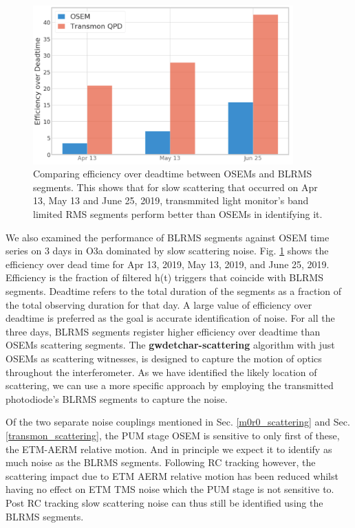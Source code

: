 \documentclass[12pt]{iopart}
\begin{document}
\par

\begin{figure}[h]
    \centering
    \includegraphics[width=10cm]{osemtransmon5.png}
    \caption{Comparing efficiency over deadtime between OSEMs and BLRMS segments. This shows that for slow scattering that occurred on Apr 13, May 13 and June 25, 2019, transmmited light monitor's band limited RMS segments perform better than OSEMs in identifying it.}
    \label{fig:osemtrans}
\end{figure}

We also examined the performance of BLRMS segments against OSEM time series on 3 days in O3a dominated by slow scattering noise. Fig. \ref{fig:osemtrans} shows the efficiency over dead time for Apr 13, 2019, May 13, 2019, and June 25, 2019. Efficiency is the fraction of filtered h(t) triggers that coincide with BLRMS segments. Deadtime refers to the total duration of the segments as a fraction of the total observing duration for that day. A large value of efficiency over deadtime is preferred as the goal is accurate identification of  noise. For all the three days, BLRMS segments register higher efficiency over deadtime than OSEMs scattering segments. The \textbf{gwdetchar-scattering} algorithm with just OSEMs as scattering witnesses, is designed to capture the motion of optics throughout the interferometer. 
As we have identified the likely location of scattering, we can use a more specific approach by employing the transmitted photodiode’s BLRMS segments to capture the noise. 


Of the two separate noise couplings mentioned in Sec. \ref{m0r0_scattering}  and Sec. \ref{transmon_scattering}, the PUM stage OSEM is sensitive to only first of these, the ETM-AERM relative motion. And in principle we expect it to identify as much noise as the BLRMS segments. Following RC tracking however, the scattering impact due to ETM AERM relative motion has been reduced whilst having no effect on ETM TMS noise which the PUM stage is not sensitive to. Post RC tracking slow scattering noise can thus still be identified using the BLRMS segments.
\end{document}
